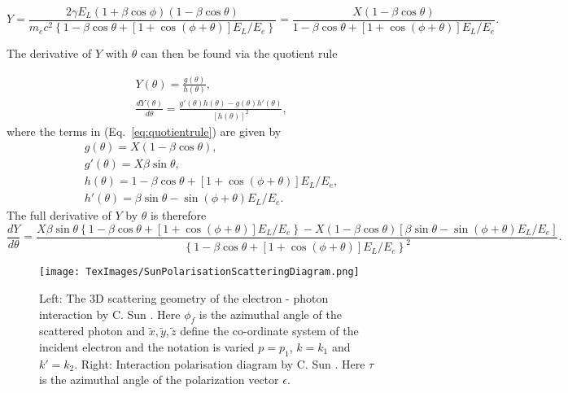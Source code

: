 \documentclass[10pt]{article}
\begin{document}
\begin{equation}
Y = \frac{2\gamma E_{L}\left(1+\beta\cos\phi\right)\left(1-\beta\cos\theta\right)}{m_{e}c^{2}\left\{1-\beta\cos\theta+\left[1+\cos\left(\phi+\theta\right)\right]E_{L}/E_{e}\right\}} = \frac{X\left(1-\beta\cos\theta\right)}{1-\beta\cos\theta+\left[1+\cos\left(\phi+\theta\right)\right]E_{L}/E_{e}}.
\label{eq:Ytheta}
\end{equation}

The derivative of $Y$ with $\theta$ can then be found via the quotient rule

\begin{gather}
Y\left(\theta\right) = \frac{g\left(\theta\right)}{h\left(\theta\right)}, \\
\frac{dY\left(\theta\right)}{d\theta} = \frac{g'\left(\theta\right)h\left(\theta\right)-g\left(\theta\right)h'\left(\theta\right)}{\left[h\left(\theta\right)\right]^{2}},
\label{eq:quotientrule}
\end{gather}
where the terms in (Eq.~\ref{eq:quotientrule}) are given by
\begin{gather}
g\left(\theta\right) = X\left(1-\beta\cos\theta\right), \\
g'\left(\theta\right) = X\beta\sin\theta, \\
h\left(\theta\right) = 1-\beta\cos\theta+\left[1+\cos\left(\phi+\theta\right)\right]E_{L}/E_{e}, \\
h'\left(\theta\right) = \beta\sin\theta-\sin\left(\phi+\theta\right)E_{L}/E_{e}.
\label{eq:quotientterms}
\end{gather}
The full derivative of $Y$ by $\theta$ is therefore
\begin{equation}
\frac{dY}{d\theta} = \frac{X\beta\sin\theta\left\{1-\beta\cos\theta+\left[1+\cos\left(\phi+\theta\right)\right]E_{L}/E_{e}\right\}-X\left(1-\beta\cos\theta\right)\left[\beta\sin\theta-\sin\left(\phi+\theta\right)E_{L}/E_{e}\right]}{\left\{1-\beta\cos\theta+\left[1+\cos\left(\phi+\theta\right)\right]E_{L}/E_{e}\right\}^{2}}.
\label{eq:dYdtheta}
\end{equation}

\begin{figure}[H]
\centering
\texttt{[image: TexImages/SunPolarisationScatteringDiagram.png]}
\caption{Left: The 3D scattering geometry of the electron - photon interaction by C. Sun \cite{sun2009characterizations}. Here $\phi_{f}$ is the azimuthal angle of the scattered photon and $\tilde{x}, \tilde{y}, \tilde{z}$ define the co-ordinate system of the incident electron and the notation is varied $p = p_{1}$, $k = k_{1}$ and $k' = k_{2}$. Right: Interaction polarisation diagram by C. Sun \cite{sun2009characterizations}. Here $\tau$ is the azimuthal angle of the polarization vector $\epsilon$.}
\label{fig:sungeometry}
\end{figure}
\end{document}
